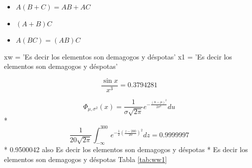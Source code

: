 \documentclass[10pt,]{krantz}
\newenvironment{Shaded}{\begin{snugshade}}{\end{snugshade}}
\newcommand{\NormalTok}[1]{#1}
\newcommand{\StringTok}[1]{\textcolor[rgb]{0.31,0.60,0.02}{#1}}
\providecommand{\tightlist}{%
  \setlength{\itemsep}{0pt}\setlength{\parskip}{0pt}}
\theoremstyle{definition}
\theoremstyle{definition}
\theoremstyle{definition}
\theoremstyle{definition}
\theoremstyle{remark}
\begin{document}
\begin{itemize}
\tightlist
\item
  \(A(B+C)=AB+AC\)
\item
  \((A+B)C\)
\item
  \(A(BC)=(AB)C\)
\end{itemize}

\begin{Shaded}
\begin{Highlighting}[]
\NormalTok{xw =}\StringTok{ 'Es decir los elementos son demagogos y déspotas'} 
\NormalTok{x1 =}\StringTok{ 'Es decir los elementos son demagogos y déspotas'} 
\end{Highlighting}
\end{Shaded}

\[
\frac{\sin x}{x^3}
= 0.3794281
\]

\[
\Phi_{\mu , \sigma ^{2}}(x)=\frac {1}{\sigma {\sqrt {2\pi }}}e^{-{\frac {(u-\mu )^{2}}{2\sigma ^{2}}}}du
\]
* \[\frac{1}{20\sqrt{2\pi }}\int_{-\infty }^{ 300}e^{- \frac{1}{2}\left(\frac{z-200}{20}\right)^2}dz=0.9999997\]
* 0.9500042 also Es decir los elementos son demagogos y déspotas
* Es decir los elementos son demagogos y déspotas
Tabla \ref{tab:ww1}
\end{document}
